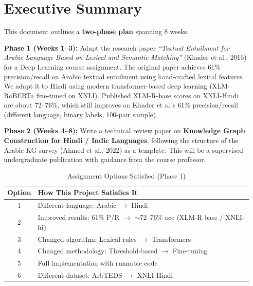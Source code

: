 \section{Executive Summary}

This document outlines a \textbf{two-phase plan} spanning 8 weeks.

\textbf{Phase 1 (Weeks 1--3):} Adapt the research paper \textit{``Textual Entailment for Arabic Language Based on Lexical and Semantic Matching''} (Khader et al., 2016) for a Deep Learning course assignment. The original paper achieves 61\% precision/recall on Arabic textual entailment using hand-crafted lexical features. We adapt it to Hindi using modern transformer-based deep learning (XLM-RoBERTa fine-tuned on XNLI). Published XLM-R-base scores on XNLI-Hindi are about 72--76\%, which still improves on Khader et al.'s 61\% precision/recall (different language, binary labels, 100-pair sample).

\textbf{Phase 2 (Weeks 4--8):} Write a technical review paper on \textbf{Knowledge Graph Construction for Hindi / Indic Languages}, following the structure of the Arabic KG survey (Ahmed et al., 2022) as a template. This will be a supervised undergraduate publication with guidance from the course professor.

\begin{table}[h]
\centering
\caption{Assignment Options Satisfied (Phase 1)}
\begin{tabularx}{\textwidth}{cX}
\toprule
\textbf{Option} & \textbf{How This Project Satisfies It} \\
\midrule
1 & Different language: Arabic $\rightarrow$ Hindi \\
2 & Improved results: 61\% P/R $\rightarrow$ $\sim$72--76\% acc (XLM-R base / XNLI-hi) \\
3 & Changed algorithm: Lexical rules $\rightarrow$ Transformers \\
4 & Changed methodology: Threshold-based $\rightarrow$ Fine-tuning \\
5 & Full implementation with runnable code \\
6 & Different dataset: ArbTEDS $\rightarrow$ XNLI Hindi \\
\bottomrule
\end{tabularx}
\end{table}
